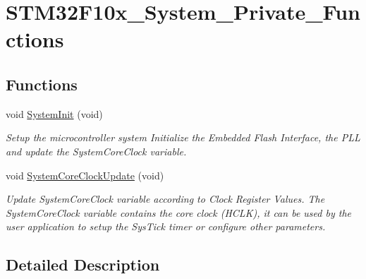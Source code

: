 \hypertarget{group___s_t_m32_f10x___system___private___functions}{\section{S\-T\-M32\-F10x\-\_\-\-System\-\_\-\-Private\-\_\-\-Functions}
\label{group___s_t_m32_f10x___system___private___functions}
}
\subsection*{Functions}
\begin{DoxyCompactItemize}
\item 
void \hyperlink{group___s_t_m32_f10x___system___private___functions_ga93f514700ccf00d08dbdcff7f1224eb2}{System\-Init} (void)
\begin{DoxyCompactList}\small\item\em Setup the microcontroller system Initialize the Embedded Flash Interface, the P\-L\-L and update the System\-Core\-Clock variable. \end{DoxyCompactList}\item 
void \hyperlink{group___s_t_m32_f10x___system___private___functions_gae0c36a9591fe6e9c45ecb21a794f0f0f}{System\-Core\-Clock\-Update} (void)
\begin{DoxyCompactList}\small\item\em Update System\-Core\-Clock variable according to Clock Register Values. The System\-Core\-Clock variable contains the core clock (H\-C\-L\-K), it can be used by the user application to setup the Sys\-Tick timer or configure other parameters. \end{DoxyCompactList}\end{DoxyCompactItemize}


\subsection{Detailed Description}



